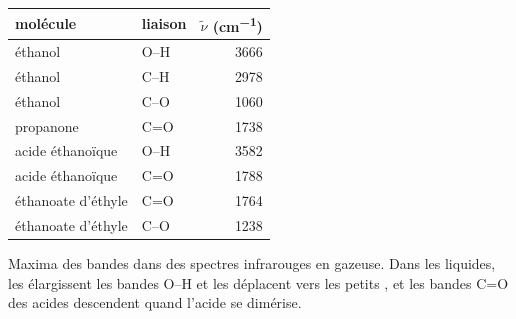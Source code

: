 \begin{omfigure}
\begin{tabular}{llr}
\hline
molécule & liaison & $\tilde\nu$ (\unit{cm^{-1}}) \\
\hline
éthanol & O--H & 3666 \\
éthanol & C--H & 2978 \\
éthanol & C--O & 1060 \\
propanone & C=O & 1738 \\
acide éthanoïque & O--H & 3582 \\
acide éthanoïque & C=O & 1788 \\
éthanoate d'éthyle & C=O & 1764 \\
éthanoate d'éthyle & C--O & 1238 \\
\hline
\end{tabular}

\smallskip
{\small Maxima des bandes dans des spectres infrarouges en  gazeuse.
Dans les liquides, les  élargissent les bandes O--H et
les déplacent vers les petits , et les bandes C=O des
acides descendent quand l'acide se dimérise.}
\end{omfigure}

